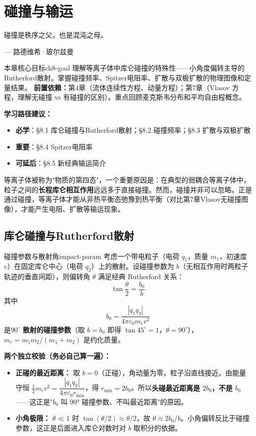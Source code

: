 \documentclass[12pt,a4paper,openany,oneside]{book}
\newcommand{\eps}{\varepsilon}
\newcommand{\difficulty}[1]{\marginnote{\hfill\textcolor{coverMid!80}{\rule[-0.1em]{2pt}{0.9em}}\,\textcolor{coverMid}{\footnotesize\textbf{[#1]}}}}
\begin{document}
\chapter{碰撞与输运}\label{ch:8}
\epigraph{碰撞是秩序之父，也是混沌之母。}{--- 路德维希·玻尔兹曼}

\begin{insight}{本章核心目标}{ch8-goal}
理解等离子体中库仑碰撞的特殊性——小角度偏转主导的Rutherford散射。掌握碰撞频率、Spitzer电阻率、扩散与双极扩散的物理图像和定量结果。
\tcblower
\textbf{前置依赖：}第4章（流体连续性方程、动量方程）；第7章（Vlasov 方程，理解无碰撞 vs 有碰撞的区别）。重点回顾麦克斯韦分布和平均自由程概念。

\textbf{学习路径建议：}

\begin{itemize}[leftmargin=*]
\item[\textcolor{red}{$\blacksquare$}] \textbf{必学}：\S8.1 库仑碰撞与Rutherford散射；\S8.2 碰撞频率；\S8.3 扩散与双极扩散
\item[\textcolor{orange}{$\blacksquare$}] \textbf{重要}：\S8.4 Spitzer电阻率
\item[\textcolor{green}{$\blacksquare$}] \textbf{可延后}：\S8.5 新经典输运简介
\end{itemize}
\end{insight}

等离子体被称为"物质的第四态"，一个重要原因是：在典型的弱耦合等离子体中，粒子之间的\textbf{长程库仑相互作用}远远多于直接碰撞。然而，碰撞并非可以忽略。正是通过碰撞，等离子体才能从非热平衡态弛豫到热平衡（对比第7章Vlasov无碰撞图像），才能产生电阻、扩散等输运现象。

\section{库仑碰撞与Rutherford散射}\difficulty{基础}

\begin{definition}{碰撞参数与散射角}{impact-param}
考虑一个带电粒子（电荷 $q_1$，质量 $m_1$，初速度 $v$）在固定库仑中心（电荷 $q_2$）上的散射。设碰撞参数为 $b$（无相互作用时两粒子轨迹的垂直间距），则偏转角 $\theta$ 满足经典 Rutherford 关系：
\[
\tan\frac{\theta}{2} = \frac{b_0}{b}
\]
其中
\[
b_0 = \frac{|q_1 q_2|}{4\pi\eps_0 m_r v^2}
\]
是\textbf{$90^\circ$ 散射的碰撞参数}（取 $b=b_0$ 即得 $\tan45^\circ=1$，$\theta=90^\circ$），$m_r = m_1 m_2/(m_1+m_2)$ 是约化质量。

\textbf{两个独立校验（务必自己算一遍）：}
\begin{itemize}
\item \textbf{正碰的最近距离：} 取 $b=0$（正碰），角动量为零，粒子沿直线接近。由能量守恒 $\frac12 m_rv^2 = \dfrac{|q_1q_2|}{4\pi\eps_0 r_{\min}}$，得 $r_{\min} = 2b_0$。所以\textbf{头碰最近距离是 $2b_0$，不是 $b_0$}——这正是"$b_0$ 叫 90° 碰撞参数、不叫最近距离"的原因。
\item \textbf{小角极限：} $\theta\ll1$ 时 $\tan(\theta/2)\approx\theta/2$，故 $\theta\approx2b_0/b$。小角偏转反比于碰撞参数，这正是后面进入库仑对数时对 $b$ 取积分的依据。
\end{itemize}
\end{definition}
\end{document}
